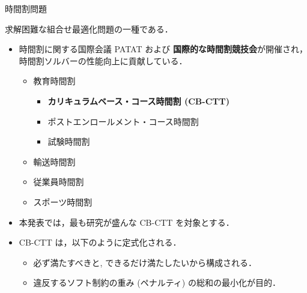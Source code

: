 \documentclass[11pt,dvipdfmx]{beamer}
\begin{document}
\begin{frame}{時間割問題}
  \begin{block}{}\centering
    求解困難な組合せ最適化問題の一種である．
  \end{block}
  \begin{itemize}
  \item 時間割に関する国際会議 PATAT および
    \alert{\bf 国際的な時間割競技会}が開催され，
    時間割ソルバーの性能向上に貢献している．
    \begin{itemize}
    \item 教育時間割
      \begin{itemize}
      \item \alert{\bf カリキュラムベース・コース時間割 (CB-CTT)}
      \item ポストエンロールメント・コース時間割
      \item 試験時間割
      \end{itemize}
    \item 輸送時間割
    \item 従業員時間割
    \item スポーツ時間割
    \end{itemize}
  \item 本発表では，最も研究が盛んな CB-CTT を対象とする．
  \item CB-CTT は，以下のように定式化される．
    \begin{itemize}
    \item 必ず満たすべきと, 
    できるだけ満たしたいから構成される．
    \item 違反するソフト制約の重み (ペナルティ) の総和の最小化が目的．
    \end{itemize}
  \end{itemize}
\end{frame}
\end{document}
